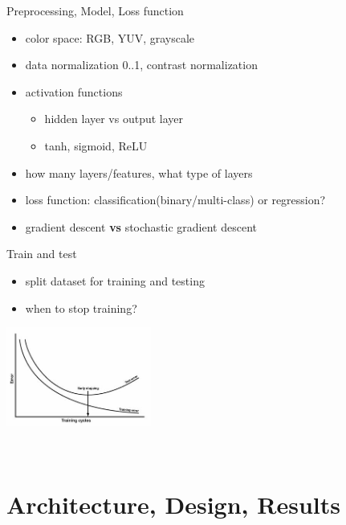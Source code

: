 \documentclass{beamer}
\begin{document}
\begin{frame}{Preprocessing, Model, Loss function}
	\begin{itemize}
		\item color space: RGB, YUV, grayscale
		\item data normalization 0..1, contrast normalization
		\item activation functions
		\begin{itemize}
			\item hidden layer vs output layer
			\item tanh, sigmoid, ReLU
		\end{itemize}
		\item how many layers/features, what type of layers
		\item loss function: classification(binary/multi-class) or regression?
		\item gradient descent \textbf{vs} stochastic gradient descent
	\end{itemize}
\end{frame}

\begin{frame}{Train and test}
	\begin{itemize}
		\item split dataset for training and testing
		\item when to stop training?
	\end{itemize}
	 \includegraphics[width=180px,height=123px]{img/traintest.jpg}
	 \begin{flushleft}
	 
			 \\
			\vspace*{-0.2cm}			
	\end{flushleft}
\end{frame}

\section{Architecture, Design, Results}
\end{document}
